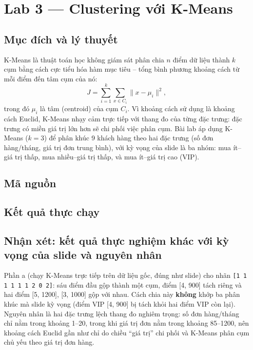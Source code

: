 \documentclass[12pt,a4paper,oneside]{article}
\begin{document}
\section{Lab 3 --- Clustering với K-Means}

\subsection{Mục đích và lý thuyết}

K-Means là thuật toán học không giám sát phân chia $n$ điểm dữ liệu thành $k$ cụm bằng cách cực tiểu hóa hàm mục tiêu -- tổng bình phương khoảng cách từ mỗi điểm đến tâm cụm của nó:
\[
J = \sum_{i=1}^{k}\sum_{x \in C_i} \lVert x - \mu_i \rVert^2,
\]
trong đó $\mu_i$ là tâm (centroid) của cụm $C_i$. Vì khoảng cách sử dụng là khoảng cách Euclid, K-Means nhạy cảm trực tiếp với thang đo của từng đặc trưng: đặc trưng có miền giá trị lớn hơn sẽ chi phối việc phân cụm. Bài lab áp dụng K-Means ($k=3$) để phân khúc 9 khách hàng theo hai đặc trưng (số đơn hàng/tháng, giá trị đơn trung bình), với kỳ vọng của slide là ba nhóm: mua ít--giá trị thấp, mua nhiều--giá trị thấp, và mua ít--giá trị cao (VIP).

\subsection{Mã nguồn}



\subsection{Kết quả thực chạy}



\subsection{Nhận xét: kết quả thực nghiệm khác với kỳ vọng của slide và nguyên nhân}

Phần a (chạy K-Means trực tiếp trên dữ liệu gốc, đúng như slide) cho nhãn \texttt{[1 1 1 1 1 1 2 0 2]}: sáu điểm đầu gộp thành một cụm, điểm [4, 900] tách riêng và hai điểm [5, 1200], [3, 1000] gộp với nhau. Cách chia này \textbf{không} khớp ba phân khúc mà slide kỳ vọng (điểm VIP [4, 900] bị tách khỏi hai điểm VIP còn lại). Nguyên nhân là hai đặc trưng lệch thang đo nghiêm trọng: số đơn hàng/tháng chỉ nằm trong khoảng 1--20, trong khi giá trị đơn nằm trong khoảng 85--1200, nên khoảng cách Euclid gần như chỉ do chiều ``giá trị'' chi phối và K-Means phân cụm chủ yếu theo giá trị đơn hàng.
\end{document}

